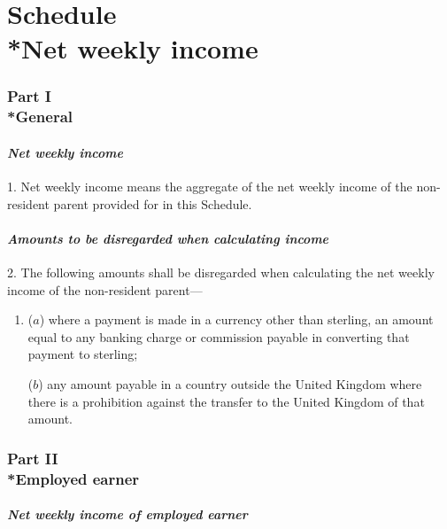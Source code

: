 \documentclass[12pt,a4paper]{article}
\begin{document}
\small

\part[Schedule --- Net weekly income]{Schedule\\*Net weekly income}

\section[Part I --- General]{Part I\\*General}

\renewcommand\parthead{--- Schedule Part I}

\subsection*{\itshape Net weekly income}

1.  Net weekly income means the aggregate of the net weekly income of the non-resident parent provided for in this Schedule.

\subsection*{\itshape Amounts to be disregarded when calculating income}

2.  The following amounts shall be disregarded when calculating the net weekly income of the non-resident parent—
\begin{enumerate}\item[]
($a$) where a payment is made in a currency other than sterling, an amount equal to any banking charge or commission payable in converting that payment to sterling;

($b$) any amount payable in a country outside the United Kingdom where there is a prohibition against the transfer to the United Kingdom of that amount.
\end{enumerate}

\section[Part II --- Employed earner]{Part II\\*Employed earner}

\renewcommand\parthead{--- Schedule Part II}

\subsection*{\itshape Net weekly income of employed earner}
\end{document}
